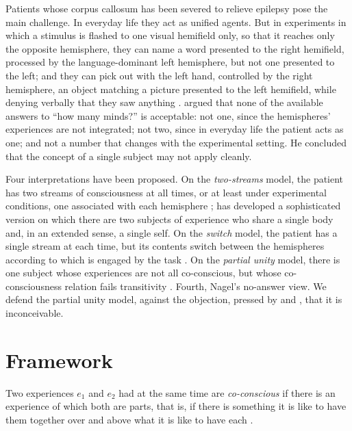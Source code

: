\documentclass{situationist-preprint}
\begin{document}
Patients whose corpus callosum has been severed to relieve epilepsy pose the main challenge. In everyday life they act as unified agents. But in experiments in which a stimulus is flashed to one visual hemifield only, so that it reaches only the opposite hemisphere, they can name a word presented to the right hemifield, processed by the language-dominant left hemisphere, but not one presented to the left; and they can pick out with the left hand, controlled by the right hemisphere, an object matching a picture presented to the left hemifield, while denying verbally that they saw anything \citep{Sperry1968,Gazzaniga2005}. \citet{Nagel1971} argued that none of the available answers to \enquote{how many minds?} is acceptable: not one, since the hemispheres' experiences are not integrated; not two, since in everyday life the patient acts as one; and not a number that changes with the experimental setting. He concluded that the concept of a single subject may not apply cleanly.

Four interpretations have been proposed. On the \emph{two-streams} model, the patient has two streams of consciousness at all times, or at least under experimental conditions, one associated with each hemisphere \citep{Sperry1968}; \citet{Schechter2018} has developed a sophisticated version on which there are two subjects of experience who share a single body and, in an extended sense, a single self. On the \emph{switch} model, the patient has a single stream at each time, but its contents switch between the hemispheres according to which is engaged by the task \citep{Bayne2008}. On the \emph{partial unity} model, there is one subject whose experiences are not all co-conscious, but whose co-consciousness relation fails transitivity \citep{Lockwood1989}. Fourth, Nagel's no-answer view. We defend the partial unity model, against the objection, pressed by \citet{Hurley1998} and \citet{Bayne2008}, that it is inconceivable.

\section{Framework}

\begin{definition}[Co-consciousness]\label{d:co}
Two experiences $e_1$ and $e_2$ had at the same time are \emph{co-conscious} if there is an experience of which both are parts, that is, if there is something it is like to have them together over and above what it is like to have each \citep{BayneChalmers2003,Dainton2000}.
\end{definition}
\end{document}
